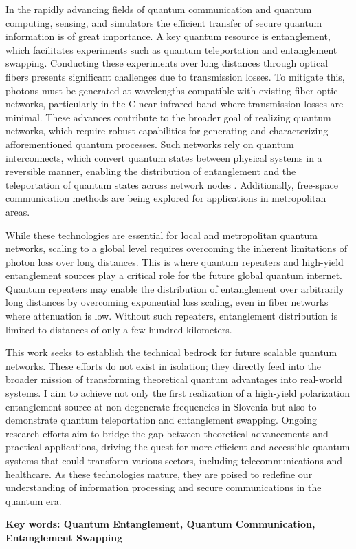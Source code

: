 \documentclass{article}
\theoremstyle{mytheoremstyle}
\theoremstyle{mytheoremstyle}
\theoremstyle{myproblemstyle}
\begin{document}
In the rapidly advancing fields of quantum communication and quantum computing, sensing, and simulators
the efficient transfer of secure quantum information is of great importance.
A key quantum resource is entanglement, which facilitates experiments such as quantum teleportation and entanglement swapping.
Conducting these experiments over long distances through optical fibers presents significant challenges due to transmission losses.
To mitigate this, photons must be generated at wavelengths compatible with existing fiber-optic networks,
particularly in the C near-infrared band where transmission losses are minimal.
These advances contribute to the broader goal of realizing quantum networks,
which require robust capabilities for generating and characterizing afforementioned quantum processes. %
Such networks rely on quantum interconnects, which convert quantum states between physical systems in a reversible manner,
enabling the distribution of entanglement and the teleportation of quantum states across network nodes \cite{Kimble_2008}.
Additionally, free-space communication methods \cite{Kržić_et_al_2023} are being explored for applications in metropolitan areas.
\par While these technologies are essential for local and metropolitan quantum networks, scaling to a global level requires overcoming
the inherent limitations of photon loss over long distances. This is where quantum repeaters and high-yield entanglement sources
play a critical role for the future global quantum internet.
Quantum repeaters may enable the distribution of entanglement over arbitrarily long distances by overcoming exponential loss scaling,
even in fiber networks where attenuation is low. Without such repeaters, entanglement distribution is limited to distances
of only a few hundred kilometers.
\par This work seeks to establish the technical bedrock for future scalable quantum networks. These efforts do not exist in isolation;
they directly feed into the broader mission of transforming theoretical quantum advantages into real-world systems.
I aim to achieve not only the first realization of a high-yield polarization entanglement source at non-degenerate
frequencies in Slovenia but also to demonstrate quantum teleportation and entanglement swapping.
Ongoing research efforts aim to bridge the gap between theoretical advancements and practical applications,
driving the quest for more efficient and accessible quantum systems that could transform various sectors,
including telecommunications and healthcare. As these technologies mature, they are poised to redefine our
understanding of information processing and secure communications in the quantum era.
\par\textbf{Key words: Quantum Entanglement, Quantum Communication, Entanglement Swapping}
\end{document}
